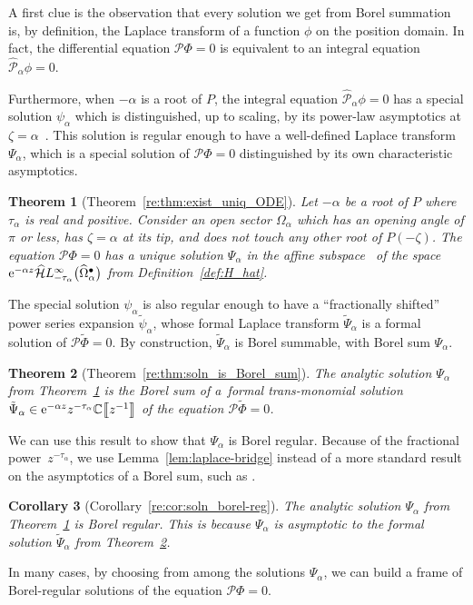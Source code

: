 \documentclass[pdftex]{sigma}
\newcommand{\dualsingexp}[1]{\widehat{\mathcal{H}}L^\infty_{#1}}
\newcommand{\C}{\mathbb{C}}
\newcommand{\series}[1]{\tilde{#1}}
\newcommand{\laplace}{\mathcal{L}}
\numberwithin{equation}{section}
\newtheorem{Theorem}{Theorem}[section]
\newtheorem{Corollary}[Theorem]{Corollary}
\begin{document}
A first clue is the observation that every solution we get from Borel summation is, by definition, the Laplace transform \smash{$\Phi = \laplace_{\zeta,\alpha}^\theta \phi$} of a function $\phi$ on the position domain. In fact, the differential equation $\mathcal{P}\Phi = 0$ is equivalent to an integral equation $\hat{\mathcal{P}}_\alpha \phi = 0$.

Furthermore, when $-\alpha$ is a root of $P$, the integral equation $\hat{\mathcal{P}}_\alpha \phi = 0$ has a special solution $\psi_\alpha$ which is distinguished, up to scaling, by its power-law asymptotics at $\zeta = \alpha$~\cite[Theorem~4.6]{reg-sing-volterra}. This solution is regular enough to have a well-defined Laplace transform $\Psi_\alpha$, which is a special solution of $\mathcal{P}\Phi = 0$ distinguished by its own characteristic asymptotics.
\begin{Theorem}[Theorem~\ref{re:thm:exist_uniq_ODE}]\label{thm:exist_uniq_ODE}
Let $-\alpha$ be a root of $P$ where $\tau_\alpha$ is real and positive. Consider an open sector $\Omega_\alpha$ which has an opening angle of $\pi$ or less, has $\zeta = \alpha$ at its tip, and does not touch any other root of $P(-\zeta)$. The equation $\mathcal{P}\Phi = 0$ has a unique solution $\Psi_\alpha$ in the affine subspace~\smash{${\rm e}^{-\alpha z} \bigl[ z^{-\tau_\alpha} + \dualsingexp{-\tau_\alpha-1}\bigl(\widehat{\Omega}_\alpha^\bullet\bigr) \bigr] $}
of the space ${\rm e}^{-\alpha z} \dualsingexp{-\tau_\alpha}\bigl(\widehat{\Omega}_\alpha^\bullet\bigr)$ from Definition~{\rm\ref{def:H_hat}}.
\end{Theorem}
The special solution $\psi_\alpha$ is also regular enough to have a ``fractionally shifted'' power series expansion $\series{\psi}_\alpha$, whose formal Laplace transform $\series{\Psi}_\alpha$ is a formal solution of $\mathcal{P}\series{\Phi} = 0$. By construction, $\series{\Psi}_\alpha$ is Borel summable, with Borel sum $\Psi_\alpha$.
\begin{Theorem}[Theorem~\ref{re:thm:soln_is_Borel_sum}]\label{thm:soln_is_Borel_sum}
The analytic solution $\Psi_\alpha$ from Theorem~{\rm\ref{thm:exist_uniq_ODE}} is the Borel sum of a~formal trans-monomial solution $\series{\Psi}_\alpha \in {\rm e}^{-\alpha z} z^{-\tau_\alpha} \C \big\llbracket z^{-1} \big\rrbracket$ of the equation $\mathcal{P}\series{\Phi} = 0$.
\end{Theorem}

We can use this result to show that $\Psi_\alpha$ is Borel regular. Because of the fractional power~$z^{-\tau_\alpha}$, we use Lemma~\ref{lem:laplace-bridge} instead of a more standard result on the asymptotics of a Borel sum, such as \cite[Theorem~5.20]{diverg-resurg-i}.
\begin{Corollary}[Corollary~\ref{re:cor:soln_borel-reg}]\label{cor:soln_borel-reg}
The analytic solution $\Psi_\alpha$ from Theorem~{\rm\ref{thm:exist_uniq_ODE}} is Borel regular. This is because $\Psi_\alpha$ is asymptotic to the formal solution $\series{\Psi}_\alpha$ from Theorem~{\rm\ref{thm:soln_is_Borel_sum}}.
\end{Corollary}
In many cases, by choosing from among the solutions $\Psi_\alpha$, we can build a frame of Borel-regular solutions of the equation $\mathcal{P}\Phi = 0$.
\end{document}
